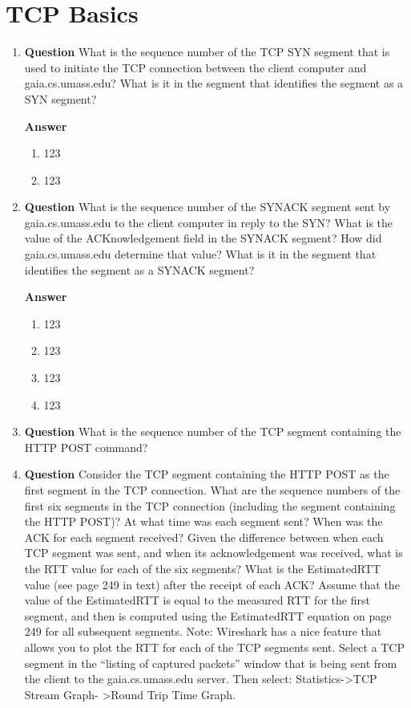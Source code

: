 \documentclass[12pt,letterpaper]{article}
\newcommand{\q}{\textbf{Question} }
\newcommand{\ans}{\textbf{Answer} }
\begin{document}
\section{TCP Basics}
\begin{enumerate}[resume]
\item \q What is the sequence number of the TCP SYN segment that is used to
initiate the TCP connection between the client computer and gaia.cs.umass.edu?
What is it in the segment that identifies the segment as a SYN segment?  

\ans
\begin{enumerate}
    \item 123
    \item 123
\end{enumerate}

\item \q What is the sequence number of the SYNACK segment sent by
gaia.cs.umass.edu to the client computer in reply to the SYN?  What is the
value of the ACKnowledgement field in the SYNACK segment?  How did
gaia.cs.umass.edu determine that value? What is it in the segment that
identifies the segment as a SYNACK segment? 

\ans
\begin{enumerate}
    \item 123
    \item 123
    \item 123
    \item 123
\end{enumerate}

\item \q What is the sequence number of the TCP segment containing the HTTP
POST command?

\item \q Consider the TCP segment containing the HTTP POST as the first segment
in the TCP connection. What are the sequence numbers of the first six segments
in the TCP connection (including the segment containing the HTTP POST)?  At
what time was each segment sent?  When was the ACK for each segment received?
Given the difference between when each TCP segment was sent, and when its
acknowledgement was received, what is the RTT value for each of the six
segments?  What is the EstimatedRTT value (see page 249 in text) after the
receipt of each ACK?  Assume that the value of the EstimatedRTT is equal to the
measured RTT for the first segment, and then is computed using the EstimatedRTT
equation on page 249 for all subsequent segments.  Note: Wireshark has a nice
feature that allows you to plot the RTT for each of the TCP segments sent.
Select a TCP segment in the “listing of captured packets” window that is being
sent from the client to the gaia.cs.umass.edu server.  Then select:
Statistics->TCP Stream Graph- >Round Trip Time Graph.  


\end{enumerate}
\end{document}
